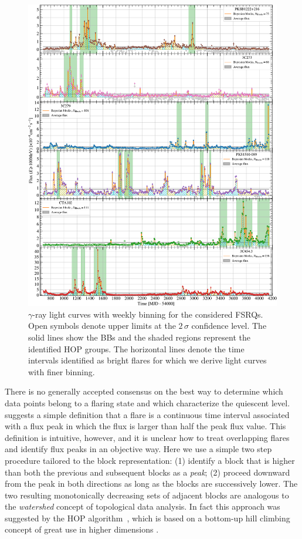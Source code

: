 \documentclass[twocolumn,linenumbers]{aastex62}
\newcommand{\gray}{$\gamma$-ray\xspace}
\begin{document}
\begin{figure}
    \centering
    \includegraphics[width = .9\linewidth]{figures/lc_weekly_tsmin9.pdf}
    \caption{\gray light curves with weekly binning for the considered FSRQs. Open symbols denote upper limits at the $2\,\sigma$ confidence level. The solid lines show the BBs and the shaded regions represent the identified HOP groups. The horizontal lines denote the time intervals identified as bright flares for which we derive light curves with finer binning.}
    \label{fig:weekly}
\end{figure}

There is no generally accepted consensus on the best way to determine which data points belong to a flaring state and which characterize the quiescent level. \citet{2013MNRAS.430.1324N} suggests a simple definition that a flare is a continuous time interval associated with a flux peak in which the flux is larger than half the peak flux value. 
This definition is intuitive, however, and it is unclear how to treat overlapping flares and identify flux peaks in an objective way. 
Here we use a simple two step procedure tailored to the block representation: (1) identify a block that is higher than both the previous and subsequent blocks as a \textit{peak}; (2) proceed downward from the peak in both directions as long as the blocks are successively lower.
The two resulting monotonically decreasing sets of adjacent blocks are analogous to the \textit{watershed} concept of topological data analysis.
In fact this approach was suggested by the 
HOP algorithm~\citep{1998ApJ...498..137E}, which is based on a bottom-up hill climbing concept of great use in higher dimensions \citep[e.g.,][]{2011ApJ...727...48W}.
\end{document}
